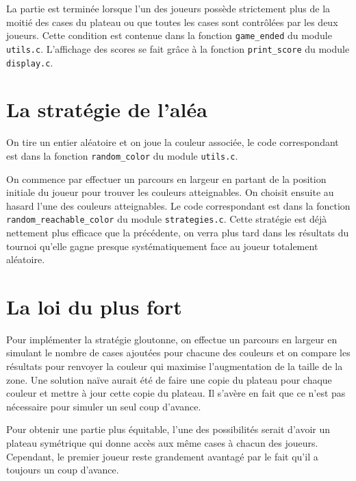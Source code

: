 \documentclass[12pt,S,fira-sans]{paper}
\begin{document}
\begin{qu}
    La partie est terminée lorsque l'un des joueurs possède strictement plus de la moitié des cases du plateau ou que toutes les cases sont contrôlées par les deux joueurs.
    Cette condition est contenue dans la fonction \verb|game_ended| du module \verb|utils.c|. L'affichage des scores se fait grâce à la fonction \verb|print_score| du module \verb|display.c|.
\end{qu}

\section{La stratégie de l'aléa}

\begin{qu}
    On tire un entier aléatoire et on joue la couleur associée, le code correspondant est dans la fonction \verb|random_color| du module \verb|utils.c|.
\end{qu}

\begin{qu}
    On commence par effectuer un parcours en largeur en partant de la position initiale du joueur pour trouver les couleurs atteignables. On choisit ensuite au hasard l'une des couleurs atteignables. Le code correspondant est dans la fonction \verb|random_reachable_color| du module \verb|strategies.c|.
    Cette stratégie est déjà nettement plus efficace que la précédente, on verra plus tard dans les résultats du tournoi qu'elle gagne presque systématiquement face au joueur totalement aléatoire.
\end{qu}

\section{La loi du plus fort}

\begin{qu}
    Pour implémenter la stratégie gloutonne, on effectue un parcours en largeur en simulant le nombre de cases ajoutées pour chacune des couleurs et on compare les résultats pour renvoyer la couleur qui maximise l'augmentation de la taille de la zone.
    Une solution naïve aurait été de faire une copie du plateau pour chaque couleur et mettre à jour cette copie du plateau. Il s'avère en fait que ce n'est pas nécessaire pour simuler un seul coup d'avance.
\end{qu}

\begin{qu}
    Pour obtenir une partie plus équitable, l'une des possibilités serait d'avoir un plateau symétrique qui donne accès aux même cases à chacun des joueurs. Cependant, le premier joueur reste grandement avantagé par le fait qu'il a toujours un coup d'avance.
\end{qu}
\end{document}

